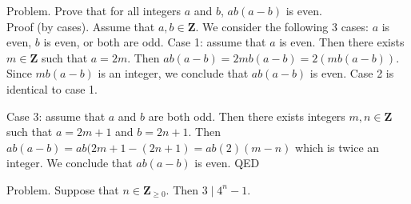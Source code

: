 \documentclass[12pt]{article}
\begin{document}
\newpage

Problem. Prove that for all integers $a$ and $b$, $ab(a-b)$ is even.
\\

Proof (by cases). Assume that $a,b \in \mathbf{Z}$. We consider the following 3 cases: $a$ is even, $b$ is even, or both are odd. Case 1: assume that $a$ is even. Then there exists $m \in \mathbf{Z}$ such that $a = 2m$. Then $ab(a-b) = 2mb(a-b) = 2(mb(a-b))$. Since $mb(a-b)$ is an integer, we conclude that $ab(a-b)$ is even. Case 2 is identical to case 1. 

Case 3: assume that $a$ and $b$  are both odd. Then there exists integers $m,n \in \mathbf{Z}$ such that $a = 2m +1$ and $b = 2n+1$. Then $ab(a-b) = ab(2m+1 - (2n+1) = ab(2)(m-n)$ which is twice an integer. We conclude that $ab(a-b)$ is even. QED

\newpage


Problem. Suppose that $n \in \mathbf{Z}_{\geq 0}$. Then $3 \mid 4^n-1$. 
\end{document}
